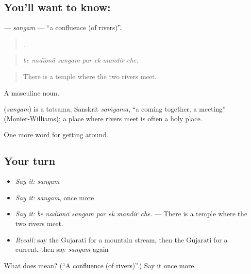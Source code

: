 \subsection*{You'll want to know: }
\textbf{} — \emph{sangam} — \textquotedblleft{}a confluence (of rivers)\textquotedblright{}.

\begin{quote}
      .
\end{quote}

\begin{quote}
\emph{be nadīonā sangam par ek mandir che.}
\end{quote}

\begin{quote}
There is a temple where the two rivers meet.
\end{quote}

A masculine noun.

\begin{cousinweb}
\textbf{} (\emph{sangam}) is a tatsama, Sanskrit \emph{saṁgama}, \textquotedblleft{}a coming together, a meeting\textquotedblright{} (Monier-Williams); a place where rivers meet is often a holy place.
\end{cousinweb}

\begin{grammarlens}[title={What you've built}]
One more word for getting around.
\end{grammarlens}

\subsection*{Your turn}
\begin{itemize}
\raggedright
  \item \emph{Say it:} \emph{sangam}
  \item \emph{Say it:} \emph{sangam}, once more
  \item \emph{Say it:} \emph{be nadīonā sangam par ek mandir che.} — There is a temple where the two rivers meet.
  \item \emph{Recall:} say the Gujarati for a mountain stream, then the Gujarati for a current, then say \emph{sangam} again
\end{itemize}

\begin{tcolorbox}[breakable,colback=teal!4,colframe=teal!35!black,title={Before you move on}]
What does  mean? (\textquotedblleft{}A confluence (of rivers)\textquotedblright{}.) Say it once more.
\end{tcolorbox}
